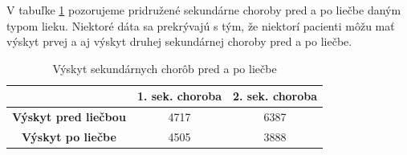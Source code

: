 \clearpage

V tabuľke \ref{tab:sekundarne} pozorujeme pridružené sekundárne choroby pred a po liečbe daným typom lieku. Niektoré dáta sa prekrývajú s tým, že niektorí pacienti môžu mať výskyt prvej a aj výskyt druhej sekundárnej choroby pred a po liečbe.

\begin{table}[h!]
\begin{tabular}{c|cc}
\hline
                             & \textbf{1. sek. choroba} & \textbf{2. sek. choroba} \\ \hline
\textbf{Výskyt pred liečbou} & 4717                             & 6387                              \\ \hline
\textbf{Výskyt po liečbe}    & 4505                             & 3888                              \\ \hline
\end{tabular}
\caption{Výskyt sekundárnych chorôb pred a po liečbe}
\label{tab:sekundarne}
\end{table}





























